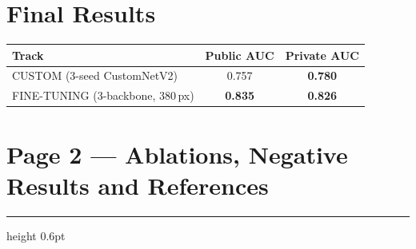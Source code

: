 \documentclass[a4paper, 10pt, twocolumn]{article}
\begin{document}
\section{Final Results}

\begin{tabular}{@{}lcc@{}}
\toprule
Track       & Public AUC & Private AUC \\
\midrule
CUSTOM (3-seed CustomNetV2) & 0.757 & \textbf{0.780} \\
FINE-TUNING (3-backbone, 380\,px)   & \textbf{0.835} & \textbf{0.826} \\
\bottomrule
\end{tabular}


\newpage
\onecolumn

\section*{\color{accent}Page 2 --- Ablations, Negative Results and References}
{\color{rulecolor}\hrule height 0.6pt}
\vspace{4pt}
\end{document}
